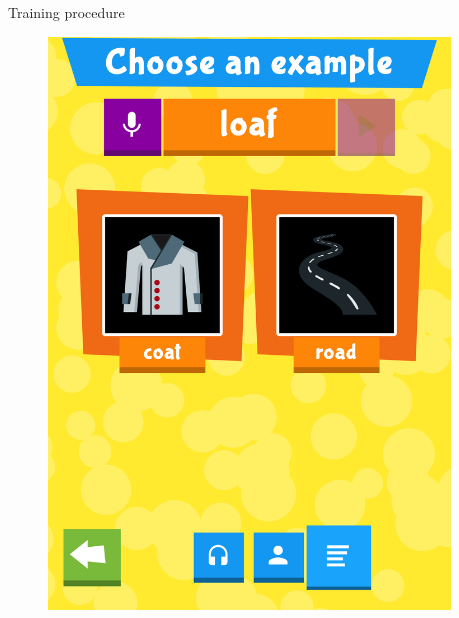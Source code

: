 \documentclass[final,xcolor={cmyk,hyperref}]{beamer}
\begin{document}
\begin{frame}[t]
\begin{columns}[t]
\begin{column}{0.4\linewidth}
\begin{block}{Training procedure}
\begin{figure}[h]
\begin{columns}
\begin{column}{\screenshotwidth}
    \includegraphics[width=\linewidth]{images/CALVin-screenshots/jpgs/choose_example}
  \end{column}
  \begin{column}{\screenshotwidth}

\end{column}
\end{columns}
\end{figure}
\end{block}
\end{column}
\end{columns}
\end{frame}
\end{document}
